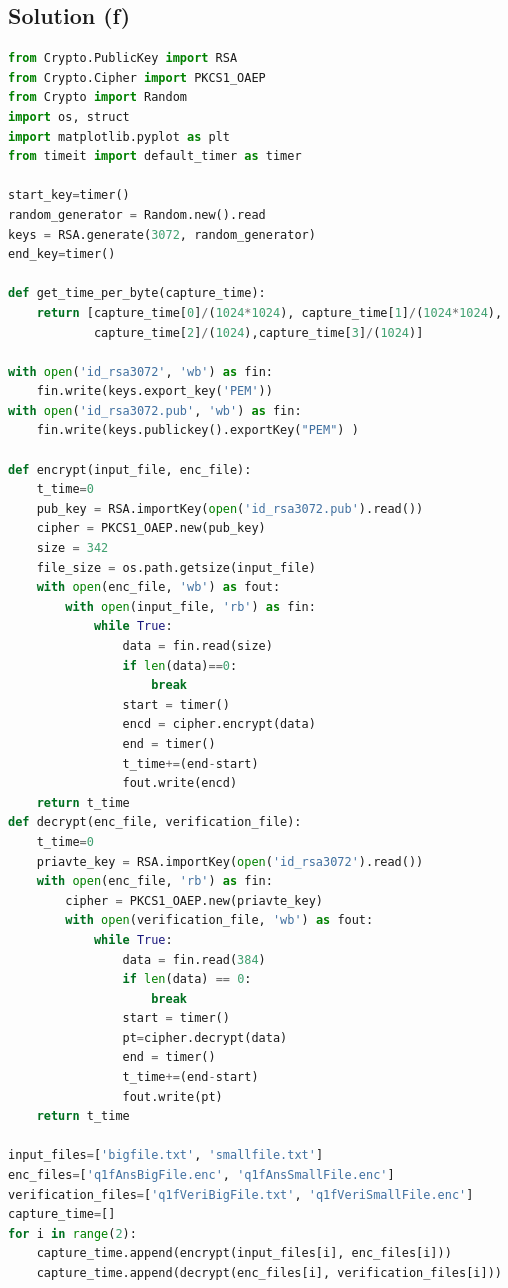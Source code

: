 \documentclass[12pt]{article}%
\begin{document}
\subsection{Solution (f)}
\begin{lstlisting}[language=Python]
from Crypto.PublicKey import RSA
from Crypto.Cipher import PKCS1_OAEP
from Crypto import Random
import os, struct
import matplotlib.pyplot as plt
from timeit import default_timer as timer

start_key=timer()
random_generator = Random.new().read
keys = RSA.generate(3072, random_generator)
end_key=timer()

def get_time_per_byte(capture_time):
    return [capture_time[0]/(1024*1024), capture_time[1]/(1024*1024),
            capture_time[2]/(1024),capture_time[3]/(1024)]

with open('id_rsa3072', 'wb') as fin:
    fin.write(keys.export_key('PEM'))
with open('id_rsa3072.pub', 'wb') as fin:
    fin.write(keys.publickey().exportKey("PEM") )

def encrypt(input_file, enc_file):
    t_time=0
    pub_key = RSA.importKey(open('id_rsa3072.pub').read())
    cipher = PKCS1_OAEP.new(pub_key)
    size = 342
    file_size = os.path.getsize(input_file)
    with open(enc_file, 'wb') as fout:
        with open(input_file, 'rb') as fin:
            while True:
                data = fin.read(size)
                if len(data)==0:
                    break
                start = timer()
                encd = cipher.encrypt(data)
                end = timer()
                t_time+=(end-start)
                fout.write(encd)
    return t_time
def decrypt(enc_file, verification_file):
    t_time=0
    priavte_key = RSA.importKey(open('id_rsa3072').read())
    with open(enc_file, 'rb') as fin:
        cipher = PKCS1_OAEP.new(priavte_key)
        with open(verification_file, 'wb') as fout:
            while True:
                data = fin.read(384)
                if len(data) == 0:
                    break
                start = timer()
                pt=cipher.decrypt(data)
                end = timer()
                t_time+=(end-start)
                fout.write(pt)
    return t_time

input_files=['bigfile.txt', 'smallfile.txt']
enc_files=['q1fAnsBigFile.enc', 'q1fAnsSmallFile.enc']
verification_files=['q1fVeriBigFile.txt', 'q1fVeriSmallFile.enc']
capture_time=[]
for i in range(2):
    capture_time.append(encrypt(input_files[i], enc_files[i]))
    capture_time.append(decrypt(enc_files[i], verification_files[i]))


\end{lstlisting}
\end{document}

